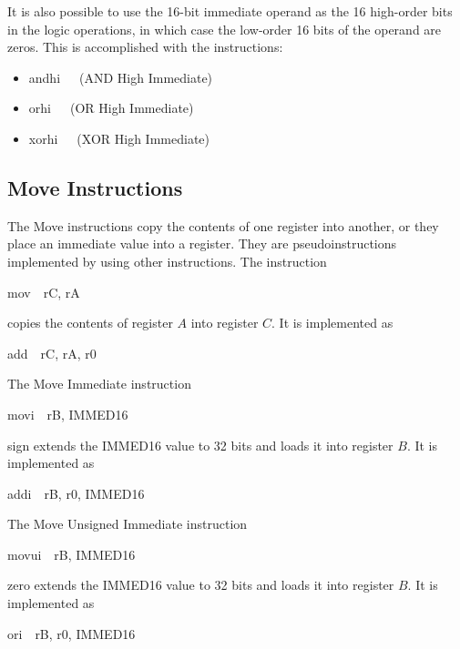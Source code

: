 \documentclass[11pt, twoside, pdftex]{article}
\begin{document}
 
\noindent
It is also possible to use the 16-bit immediate
operand as the 16 high-order bits in the logic operations, in which case the low-order 16 bits 
of the operand are zeros. This is accomplished with the instructions: 
\begin{itemize}
\item {\sf andhi}~~~(AND High Immediate) 
\item {\sf orhi}~~~(OR High Immediate)
\item {\sf xorhi}~~~(XOR High Immediate)
\end{itemize}

\subsection{Move Instructions}

The Move instructions copy the contents of one register into another, or they place an immediate
value into a register. They are pseudoinstructions implemented by using other instructions.
The instruction
\begin{center}
{\sf mov~~rC, rA}
\end{center}
\noindent
copies the contents of register $A$ into register $C$. It is implemented as 
\begin{center}
{\sf add~~rC, rA, r0}
\end{center}
 

\noindent
The Move Immediate instruction
\begin{center}
{\sf movi~~rB, IMMED16}
\end{center}
\noindent
sign extends the IMMED16 value to 32 bits and loads it into register $B$.
It is implemented as
\begin{center}
{\sf addi~~rB, r0, IMMED16}
\end{center}
 

\noindent
The Move Unsigned Immediate instruction
\begin{center}
{\sf movui~~rB, IMMED16}
\end{center}
\noindent
zero extends the IMMED16 value to 32 bits and loads it into register $B$.
It is implemented as
\begin{center}
{\sf ori~~rB, r0, IMMED16}
\end{center}
 
\end{document}
